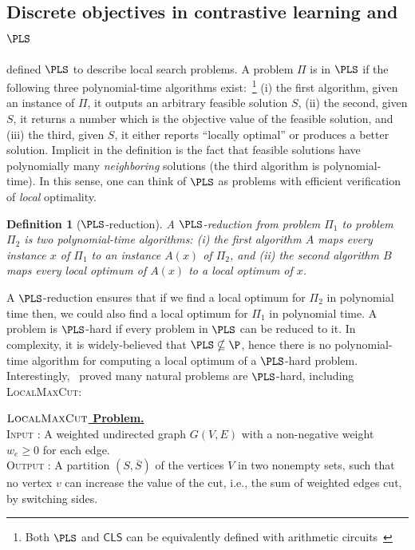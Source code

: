 \documentclass{article}
\theoremstyle{definition}  %
\theoremstyle{plain}
\newtheorem{definition}{Definition}
\numberwithin{observation}{section}
\numberwithin{claim}{section}
\numberwithin{fact}{section}
\numberwithin{lemma}{section}
\numberwithin{proposition}{section}
\numberwithin{theorem}{section}
\numberwithin{corollary}{section}
\numberwithin{definition}{section}
\renewcommand{\bar}[1]{\overline{#1}}
\newcommand{\CLS}{\mathsf{CLS}}
\newenvironment{nproblem}[1][\unskip]{%
  \medskip
  \begin{mdframed}
  \noindent
  \textbf{\underline{$#1$ Problem.}} \\
  \noindent
}{%
  \end{mdframed}
  \medskip %
}
\theoremstyle{plain}
\begin{document}
\subsection{Discrete objectives in contrastive learning and \texorpdfstring{$\PLS$}{PLS}}

\citet{johnson1988easy} defined $\PLS$ to describe local search problems. A problem $\Pi$ is in $\PLS$ if the following three polynomial-time algorithms exist:~\footnote{Both $\PLS$ and $\CLS$ can be equivalently defined with arithmetic circuits~\citep{Fearnley23:Complexity}} (i) the first algorithm, given an instance of $\Pi$, it outputs an arbitrary feasible solution $S$, (ii) the second, given $S$, it returns a number which is the objective value of the feasible solution, and (iii) the third, given $S$, it either reports ``locally optimal'' or produces a better solution. Implicit in the definition is the fact that feasible solutions have polynomially many \textit{neighboring} solutions (the third algorithm is polynomial-time). In this sense, one can think of $\PLS$ as problems with efficient verification of \textit{local} optimality.


\begin{definition}[$\PLS$-reduction]
A $\PLS$-reduction from problem $\Pi_1$ to problem $\Pi_2$ is two polynomial-time algorithms: (i) the first algorithm $A$ maps every instance $x$ of $\Pi_1$ to an instance $A(x)$ of $\Pi_2$, and (ii) the second algorithm $B$ maps every local optimum of $A(x)$ to a local optimum of $x$.
\end{definition}
A $\PLS$-reduction ensures that if we find a local optimum for $\Pi_2$ in polynomial time then, we could also find a local optimum for $\Pi_1$ in polynomial time. A problem is $\PLS$-hard if every problem in $\PLS$ can be reduced to it. In complexity, it is widely-believed that $\PLS\nsubseteq \P$, hence there is no polynomial-time algorithm for computing a local optimum of a $\PLS$-hard problem. Interestingly,~\citet{schaffer1991simple} proved many natural problems are $\PLS$-hard, including \textsc{LocalMaxCut}:

\begin{nproblem}[\textsc{LocalMaxCut}]\label{def:maxcut}
 \textsc{Input :} A weighted undirected graph $G(V,E)$ with a non-negative weight $w_{e}\ge0$ for each edge.
\\
  \noindent \textsc{Output :}  A partition $(S,\bar{S})$ of the vertices $V$ in two nonempty sets, such that no vertex $v$ can increase the value of the cut, i.e., the sum of weighted edges cut, by switching sides.
\end{nproblem}
\end{document}
